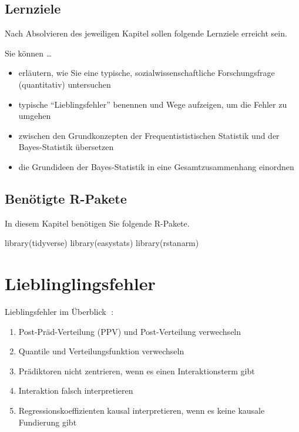 \documentclass[
  a4paper,
  DIV=11]{scrreprt}
\newenvironment{Shaded}{\begin{snugshade}}{\end{snugshade}}
\newcommand{\FunctionTok}[1]{\textcolor[rgb]{0.28,0.35,0.67}{#1}}
\newcommand{\NormalTok}[1]{\textcolor[rgb]{0.00,0.23,0.31}{#1}}
\providecommand{\tightlist}{%
  \setlength{\itemsep}{0pt}\setlength{\parskip}{0pt}}\usepackage{longtable,booktabs,array}
\theoremstyle{definition}
\theoremstyle{remark}
\begin{document}
\hypertarget{lernziele-11}{%
\subsection{Lernziele}\label{lernziele-11}}

Nach Absolvieren des jeweiligen Kapitel sollen folgende Lernziele
erreicht sein.

Sie können \ldots{}

\begin{itemize}
\tightlist
\item
  erläutern, wie Sie eine typische, sozialwissenschaftliche
  Forschungsfrage (quantitativ) untersuchen
\item
  typische ``Lieblingsfehler'' benennen und Wege aufzeigen, um die
  Fehler zu umgehen
\item
  zwischen den Grundkonzepten der Frequentististischen Statistik und der
  Bayes-Statistik übersetzen
\item
  die Grundideen der Bayes-Statistik in eine Gesamtzusammenhang
  einordnen
\end{itemize}

\hypertarget{benuxf6tigte-r-pakete-6}{%
\subsection{Benötigte R-Pakete}\label{benuxf6tigte-r-pakete-6}}

In diesem Kapitel benötigen Sie folgende R-Pakete.

\begin{Shaded}
\begin{Highlighting}[]
\FunctionTok{library}\NormalTok{(tidyverse)}
\FunctionTok{library}\NormalTok{(easystats)}
\FunctionTok{library}\NormalTok{(rstanarm)}
\end{Highlighting}
\end{Shaded}

\hypertarget{lieblinglingsfehler}{%
\section{Lieblinglingsfehler}\label{lieblinglingsfehler}}

Lieblingsfehler im Überblick 🤷:

\begin{enumerate}
\def\labelenumi{\arabic{enumi}.}
\tightlist
\item
  Post-Präd-Verteilung (PPV) und Post-Verteilung verwechseln
\item
  Quantile und Verteilungsfunktion verwechseln
\item
  Prädiktoren nicht zentrieren, wenn es einen Interaktionsterm gibt
\item
  Interaktion falsch interpretieren
\item
  Regressionskoeffizienten kausal interpretieren, wenn es keine kausale
  Fundierung gibt
\end{enumerate}
\end{document}
